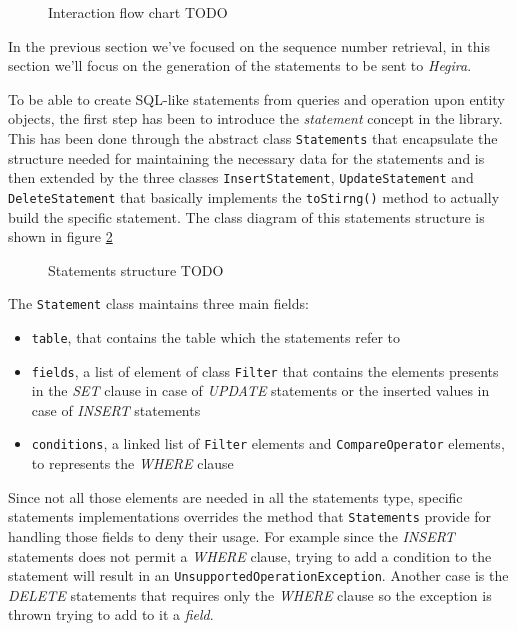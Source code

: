 \begin{figure}[tbh]
  \centering
  \begin{minipage}[c][0.33\textheight][c]{0.5\textwidth}
  \end{minipage}
  \caption{Interaction flow chart TODO}
  \label{fig:flow-chart}
\end{figure} 

\noindent In the previous section we've focused on the sequence number retrieval, in this section we'll focus on the generation of the statements to be sent to \textit{Hegira}.

\newparagraph To be able to create SQL-like statements from queries and operation upon entity objects, the first step has been to introduce the \textit{statement} concept in the library. This has been done through the abstract class \texttt{Statements} that encapsulate the structure needed for maintaining the necessary data for the statements and is  then extended by the three classes \texttt{InsertStatement}, \texttt{UpdateStatement} and \texttt{DeleteStatement} that basically implements the \texttt{toStirng()} method to actually build the specific statement.
The class diagram of this statements structure is shown in figure \ref{fig:statements}

\begin{figure}[tbh]
  \centering
  \begin{minipage}[c][0.33\textheight][c]{0.5\textwidth}
  \end{minipage}
  \caption{Statements structure TODO}
  \label{fig:statements}
\end{figure} 

\noindent The \texttt{Statement} class maintains three main fields:
\begin{itemize}
\item \texttt{table}, that contains the table which the statements refer to
\item \texttt{fields}, a list of element of class \texttt{Filter} that contains the elements presents in the \textit{SET} clause in case of \textit{UPDATE} statements or the inserted values in case of \textit{INSERT} statements
\item \texttt{conditions}, a linked list of \texttt{Filter} elements and \texttt{CompareOperator} elements, to represents the \textit{WHERE} clause 
\end{itemize} 

\noindent Since not all those elements are needed in all the statements type, specific statements implementations overrides the method that \texttt{Statements} provide for handling those fields to deny their usage. For example since the \textit{INSERT} statements does not permit a \textit{WHERE} clause, trying to add a condition to the statement will result in an \texttt{UnsupportedOperationException}. Another case is the \textit{DELETE} statements that requires only the \textit{WHERE} clause so the exception is thrown trying to add to it a \textit{field}.

